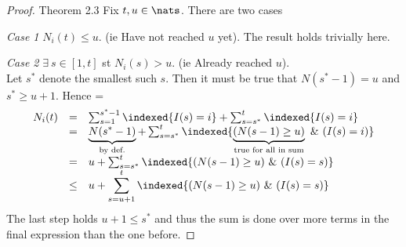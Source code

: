 \documentclass[11pt,a4paper]{article}
\begin{document}
  \begin{proof}{Theorem 2.3}
    Fix $t,u\in\nats$. There are two cases
    \par\textit{Case 1} $N_i(t)\leq u$. (ie Have not reached $u$ yet). The result holds trivially here.

    \par\textit{Case 2} $\exists\ s\in[1,t]$ st $N_i(s)>u$. (ie Already reached $u$).\\
    Let $s^*$ denote the smallest such $s$. Then it must be true that $N(s^*-1)=u$ and $s^*\geq u+1$. Hence
    \everymath={\displaystyle}
    \[\begin{array}{rcl}
      N_i(t)&=&\sum_{s=1}^{s^*-1}\indexed{I(s)=i}+\sum_{s=s^*}^t\indexed{I(s)=i}\\
      &=&\underbrace{N(s^*-1)}_{\tiny\text{by def.}}+\sum_{s=s^*}^t\indexed\{\underbrace{(N(s-1)\geq u)}_{\tiny\text{true for all in sum}}\ \&\ (I(s)=i)\}\\
      &=&u+\sum_{s=s^*}^t\indexed\{(N(s-1)\geq u)\ \&\ (I(s)=s)\}\\
      &\leq&\displaystyle u+\sum_{s=u+1}^t\indexed\{(N(s-1)\geq u)\ \&\ (I(s)=s)\}
    \end{array}\]
    The last step holds $u+1\leq s^*$ and thus the sum is done over more terms in the final expression than the one before.
    \proved
  \end{proof}
\end{document}
